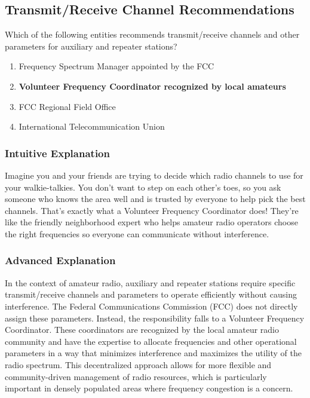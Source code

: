 \subsection{Transmit/Receive Channel Recommendations}
\label{T1A08}

\begin{tcolorbox}[colback=gray!10!white,colframe=black!75!black,title=T1A08]
Which of the following entities recommends transmit/receive channels and other parameters for auxiliary and repeater stations?
\begin{enumerate}[label=\Alph*)]
    \item Frequency Spectrum Manager appointed by the FCC
    \item \textbf{Volunteer Frequency Coordinator recognized by local amateurs}
    \item FCC Regional Field Office
    \item International Telecommunication Union
\end{enumerate}
\end{tcolorbox}

\subsubsection{Intuitive Explanation}
Imagine you and your friends are trying to decide which radio channels to use for your walkie-talkies. You don’t want to step on each other’s toes, so you ask someone who knows the area well and is trusted by everyone to help pick the best channels. That’s exactly what a Volunteer Frequency Coordinator does! They’re like the friendly neighborhood expert who helps amateur radio operators choose the right frequencies so everyone can communicate without interference.

\subsubsection{Advanced Explanation}
In the context of amateur radio, auxiliary and repeater stations require specific transmit/receive channels and parameters to operate efficiently without causing interference. The Federal Communications Commission (FCC) does not directly assign these parameters. Instead, the responsibility falls to a Volunteer Frequency Coordinator. These coordinators are recognized by the local amateur radio community and have the expertise to allocate frequencies and other operational parameters in a way that minimizes interference and maximizes the utility of the radio spectrum. This decentralized approach allows for more flexible and community-driven management of radio resources, which is particularly important in densely populated areas where frequency congestion is a concern.


